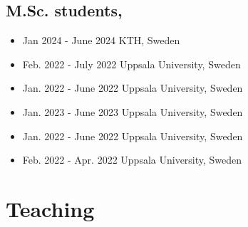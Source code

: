 \documentclass[10pt,A4]{article} %
\begin{document}
  \subsection{\noindent M.Sc.  students,   }
  \begin{itemize}
    
        \item {}
        { Jan 2024 - June 2024 }
        { KTH, Sweden }
        {  }
     
        \item {}
        { Feb. 2022 - July 2022 }
        { Uppsala University, Sweden }
        {  }
     
        \item {}
        { Jan. 2022 - June 2022 }
        { Uppsala University, Sweden }
        {  }
     
        \item {}
        { Jan. 2023 - June 2023 }
        { Uppsala University, Sweden }
        {  }
     
        \item {}
        { Jan. 2022 - June 2022 }
        { Uppsala University, Sweden }
        {  }
     
        \item {}
        { Feb. 2022 - Apr. 2022 }
        { Uppsala University, Sweden }
        {  }
     
  \end{itemize}



\section{Teaching}
\end{document}
